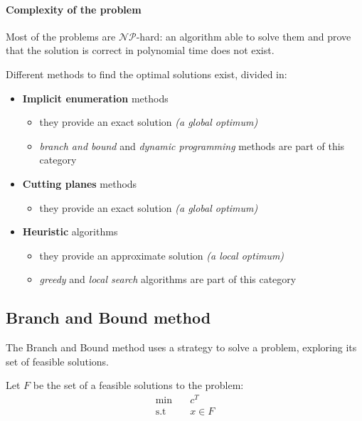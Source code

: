 \documentclass[english]{article}
\begin{document}
\paragraph{Complexity of the \ILP problem}

Most of the \ILP problems are \(\mathcal{NP}\)-hard:
an algorithm able to solve them and prove that the solution is correct in polynomial time does not exist.

Different methods to find the optimal solutions exist, divided in:

\begin{itemize}
  \item \textbf{Implicit enumeration} methods
        \begin{itemize}
          \item[\cmarkthin] they provide an exact solution \textit{(a global optimum)}
          \item \textit{branch and bound} and \textit{dynamic programming} methods are part of this category
        \end{itemize}
  \item \textbf{Cutting planes} methods
        \begin{itemize}
          \item[\cmarkthin] they provide an exact solution \textit{(a global optimum)}
        \end{itemize}
  \item \textbf{Heuristic} algorithms
        \begin{itemize}
          \item[\xmarkthin] they provide an approximate solution \textit{(a local optimum)}
          \item \textit{greedy} and \textit{local search} algorithms are part of this category
        \end{itemize}
\end{itemize}

\subsection{Branch and Bound method}

The Branch and Bound method uses a  strategy to solve a \ILP problem, exploring its set of feasible solutions.

Let \(F\) be the set of a feasible solutions to the problem:
\begin{align*}
  \min       \quad & c^T     \\
  \text{s.t} \quad & x \in F \\
\end{align*}
\end{document}
